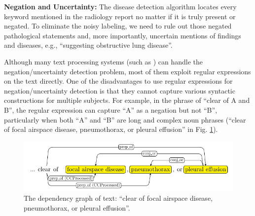 \documentclass[10pt,twocolumn,letterpaper]{article}
\begin{document}

{\bf Negation and Uncertainty:}
The disease detection algorithm locates every keyword mentioned in the radiology report no matter if it is truly present or negated. To eliminate the noisy labeling, we need to rule out those negated pathological statements and, more importantly, uncertain mentions of findings and diseases, e.g., ``suggesting obstructive lung disease''.

Although many text processing systems (such as \cite{chapman2001simple}) can handle the negation/uncertainty detection problem, most of them exploit regular expressions on the text directly. One of the disadvantages to use regular expressions for negation/uncertainty detection is that they cannot capture various syntactic constructions for multiple subjects. For example, in the phrase of ``clear of A and B'', the regular expression can capture ``A'' as a negation but not ``B'', particularly when both ``A'' and ``B'' are long and complex noun phrases (``clear of focal airspace disease, pneumothorax, or pleural effusion'' in Fig. \ref{fig:dependency_graph}). 

\begin{figure}
	\includegraphics[width=\columnwidth]{linking.pdf}
	\caption{The dependency graph of text: ``clear of focal airspace disease, pneumothorax, or pleural effusion''.}
	\label{fig:dependency_graph}
\end{figure}
\end{document}
